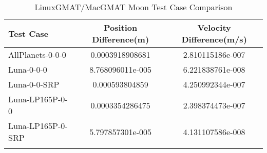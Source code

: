 \begin{table}[htbp!]
\centering
\caption{ LinuxGMAT/MacGMAT Moon Test Case Comparison}
      \begin{tabular}{lcc}
      \hline\hline
          Test Case & Position Difference(m) & Velocity Difference(m/s) \\
         \hline
         AllPlanets-0-0-0 & 0.0003918908681 & 2.810115186e-007 \\
         Luna-0-0-0 & 8.768096011e-005 & 6.221838761e-008 \\
         Luna-0-0-SRP & 0.000593804859 & 4.250992344e-007 \\
         Luna-LP165P-0-0 & 0.0003354286475 & 2.398374473e-007 \\
         Luna-LP165P-0-SRP & 5.797857301e-005 & 4.131107586e-008 \\
      \hline\hline
      \label{Table: Moon LinuxGMAT-MacGMAT Table} 
\end{tabular}
\end{table}
